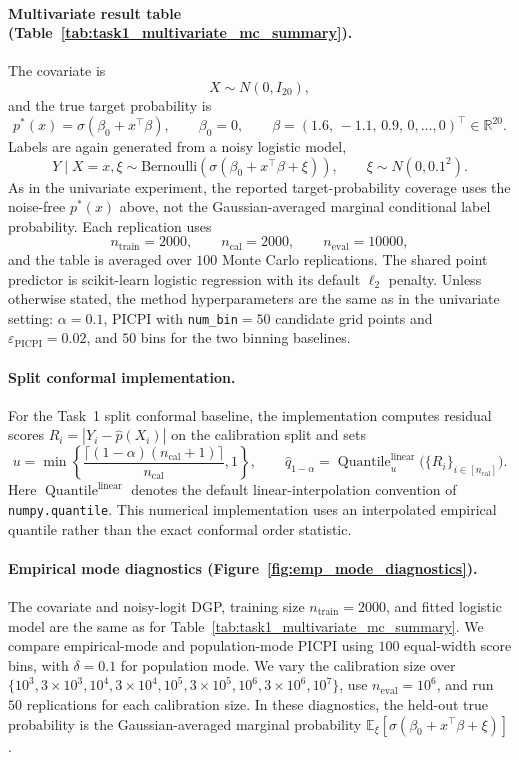 \documentclass[11pt]{article}
\theoremstyle{statplain}
\theoremstyle{statdefinition}
\newcommand{\0}{\mathbf{0}}
\begin{document}
\paragraph{Multivariate result table (Table~\ref{tab:task1_multivariate_mc_summary}).}
The covariate is
\[
X \sim N(0, I_{20}),
\]
and the true target probability is
\[
p^*(x) = \sigma(\beta_0 + x^\top \beta),
\qquad
\beta_0 = 0,
\qquad
\beta = (1.6,\,-1.1,\,0.9,\,0,\ldots,0)^\top \in \mathbb{R}^{20}.
\]
Labels are again generated from a noisy logistic model,
\[
Y \mid X=x,\xi \sim \mathrm{Bernoulli}\!\left(\sigma(\beta_0 + x^\top \beta + \xi)\right),
\qquad
\xi \sim N(0, 0.1^2).
\]
As in the univariate experiment, the reported target-probability coverage uses the noise-free $p^*(x)$ above, not the Gaussian-averaged marginal conditional label probability.
Each replication uses
\[
n_{\mathrm{train}} = 2000,\qquad
n_{\mathrm{cal}} = 2000,\qquad
n_{\mathrm{eval}} = 10000,
\]
and the table is averaged over $100$ Monte Carlo replications. The shared point predictor is scikit-learn logistic regression with its default $\ell_2$ penalty. Unless otherwise stated, the method hyperparameters are the same as in the univariate setting: $\alpha = 0.1$, PICPI with \texttt{num\_bin}$=50$ candidate grid points and $\varepsilon_{\mathrm{PICPI}} = 0.02$, and $50$ bins for the two binning baselines.

\paragraph{Split conformal implementation.}
For the Task~1 split conformal baseline, the implementation computes residual scores $R_i=|Y_i-\hat p(X_i)|$ on the calibration split and sets
\[
u=\min\!\left\{\frac{\lceil(1-\alpha)(n_{\mathrm{cal}}+1)\rceil}{n_{\mathrm{cal}}},1\right\},
\qquad
\hat q_{1-\alpha}=\operatorname{Quantile}^{\mathrm{linear}}_u
\bigl(\{R_i\}_{i\in[n_{\mathrm{cal}}]}\bigr).
\]
Here $\operatorname{Quantile}^{\mathrm{linear}}$ denotes the default linear-interpolation convention of \texttt{numpy.quantile}. This numerical implementation uses an interpolated empirical quantile rather than the exact conformal order statistic.

\paragraph{Empirical mode diagnostics (Figure~\ref{fig:emp_mode_diagnostics}).}
\label{app:task1_setup_emp_mode_diagnostics} 
The covariate and noisy-logit DGP, training size $n_{\mathrm{train}}=2000$, and fitted logistic model are the same as for Table~\ref{tab:task1_multivariate_mc_summary}. We compare empirical-mode and population-mode PICPI using $100$ equal-width score bins, with $\delta=0.1$ for population mode. We vary the calibration size over $\{10^3,3\times10^3,10^4,3\times10^4,10^5,3\times10^5,10^6,3\times10^6,10^7\}$, use $n_{\mathrm{eval}}=10^6$, and run $50$ replications for each calibration size. In these diagnostics, the held-out true probability is the Gaussian-averaged marginal probability $\mathbb E_\xi[\sigma(\beta_0+x^\top\beta+\xi)]$.
\end{document}
